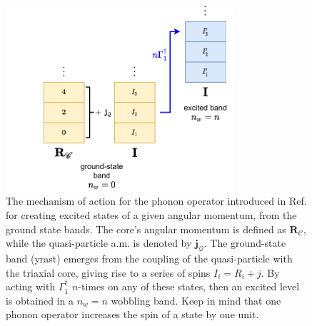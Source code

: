 \begin{figure}
    \centering
    \includegraphics[width=0.75\textwidth]{Chapters/Figures/w0_phonon_operator.pdf}
    \caption{The mechanism of action for the phonon operator introduced in Ref. \cite{raduta2017semiclassical} for creating excited states of a given angular momentum, from the ground state bands. The core's angular momentum is defined as $\mathbf{R}_\mathscr{C}$, while the quasi-particle a.m. is denoted by $\mathbf{j}_\mathcal{Q}$. The ground-state band (yrast) emerges from the coupling of the quasi-particle with the triaxial core, giving rise to a series of spins $I_i=R_i+j$. By acting with $\Gamma_1^\dagger$ $n$-times on any of these states, then an excited level is obtained in a $n_w=n$ wobbling band. Keep in mind that one phonon operator increases the spin of a state by one unit.}
    \label{phonon-operator-schematic}
\end{figure}


